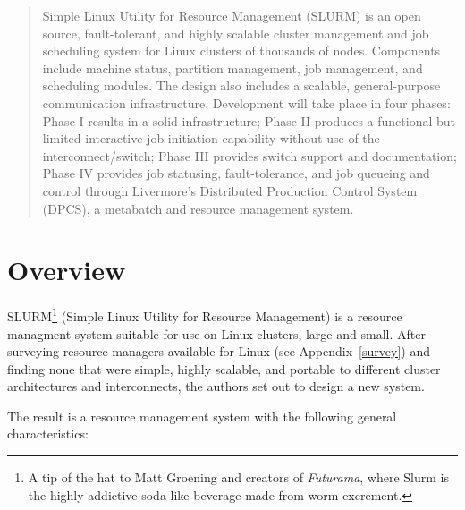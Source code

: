 \maketitle

\begin{abstract}
Simple Linux Utility for Resource Management (SLURM) is an open source,
fault-tolerant, and highly scalable cluster management and job 
scheduling system for Linux clusters of 
thousands of nodes.  Components include machine status, partition
management, job management, and scheduling modules.  The design also 
includes a scalable, general-purpose communication infrastructure.
Development will take place in four phases:  Phase I results in a solid
infrastructure;  Phase II produces a functional but limited interactive 
job initiation capability without use of the interconnect/switch; 
Phase III provides switch support and documentation; Phase IV provides 
job statusing, fault-tolerance, and job queueing and control through  
Livermore's Distributed Production Control System (DPCS), a metabatch and
resource management system.
\end{abstract}

\vspace{0.25in}


\newpage



\section{Overview}

SLURM\footnote{A tip of the hat to Matt Groening and creators of {\em Futurama},
where Slurm is the highly addictive soda-like beverage made from worm
excrement.} (Simple Linux Utility for Resource Management) 
is a resource managment 
system suitable for use on Linux clusters, large and small.  After surveying 
resource managers available for Linux (see Appendix~\ref{survey}) and finding 
none that were simple, highly scalable, and portable to different cluster 
architectures and interconnects, the authors set out to design a new system.

The result is a resource management system with the following general
characteristics:

